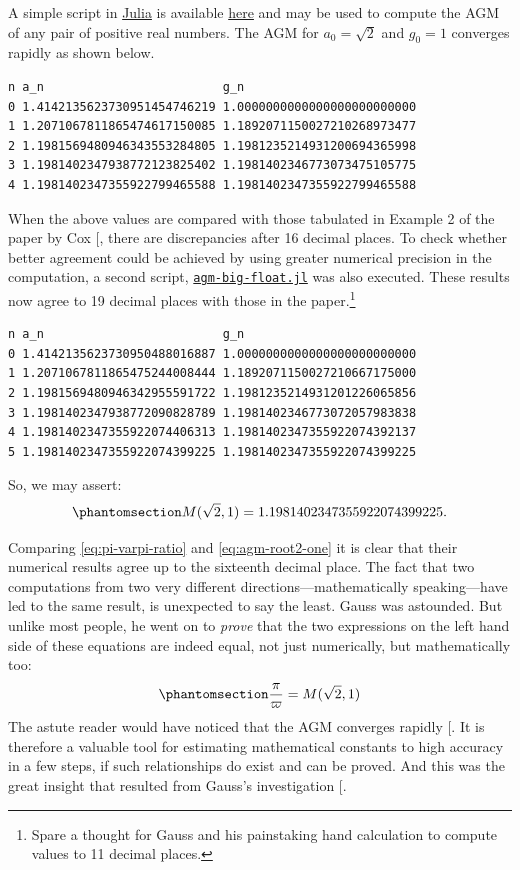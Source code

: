 \documentclass[
  a4paper,
]{article}
\begin{document}
A simple script in \href{https://julialang.org/}{Julia} is available
\href{auxiliary/agm-float.jl}{here} and may be used to compute the AGM
of any pair of positive real numbers. The AGM for \(a_0 = \sqrt{2}\) and
\(g_0 = 1\) converges rapidly as shown below.

\begin{verbatim}
n a_n                         g_n
0 1.4142135623730951454746219 1.0000000000000000000000000
1 1.2071067811865474617150085 1.1892071150027210268973477
2 1.1981569480946343553284805 1.1981235214931200694365998
3 1.1981402347938772123825402 1.1981402346773073475105775
4 1.1981402347355922799465588 1.1981402347355922799465588
\end{verbatim}

When the above values are compared with those tabulated in Example 2 of
the paper by Cox {[}\citeproc{ref-cox-1984}{33}{]}, there are
discrepancies after 16 decimal places. To check whether better agreement
could be achieved by using greater numerical precision in the
computation, a second script,
\href{auxiliary/agm-big-float.jl}{\texttt{agm-big-float.jl}} was also
executed. These results now agree to 19 decimal places with those in the
paper.\footnote{Spare a thought for Gauss and his painstaking hand
  calculation to compute values to 11 decimal places.}

\begin{verbatim}
n a_n                         g_n
0 1.4142135623730950488016887 1.0000000000000000000000000
1 1.2071067811865475244008444 1.1892071150027210667175000
2 1.1981569480946342955591722 1.1981235214931201226065856
3 1.1981402347938772090828789 1.1981402346773072057983838
4 1.1981402347355922074406313 1.1981402347355922074392137
5 1.1981402347355922074399225 1.1981402347355922074399225
\end{verbatim}

So, we may assert:
\begin{equation}\phantomsection\label{eq:agm-root2-one}{
M(\sqrt{2}, 1) = 1.1981402347355922074399225.
}\end{equation}

Comparing \cref{eq:pi-varpi-ratio} and \cref{eq:agm-root2-one} it is
clear that their numerical results agree up to the sixteenth decimal
place. The fact that two computations from two very different
directions---mathematically speaking---have led to the same result, is
unexpected to say the least. Gauss was astounded. But unlike most
people, he went on to \emph{prove} that the two expressions on the left
hand side of these equations are indeed equal, not just numerically, but
mathematically too: \begin{equation}\phantomsection\label{eq:ratio-agm}{
\frac{\pi}{\varpi} = M(\sqrt{2}, 1)
}\end{equation} The astute reader would have noticed that the AGM
converges rapidly {[}\citeproc{ref-pi-and-the-agm}{36}{]}. It is
therefore a valuable tool for estimating mathematical constants to high
accuracy in a few steps, if such relationships do exist and can be
proved. And this was the great insight that resulted from Gauss's
investigation {[}\citeproc{ref-pi-and-the-agm}{36}{]}.
\end{document}
